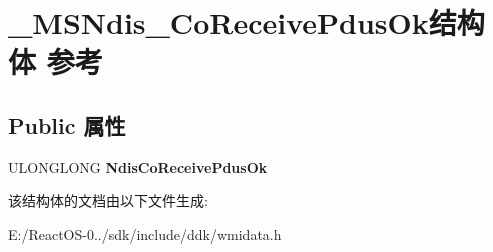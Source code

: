 \hypertarget{struct___m_s_ndis___co_receive_pdus_ok}{}\section{\+\_\+\+M\+S\+Ndis\+\_\+\+Co\+Receive\+Pdus\+Ok结构体 参考}
\label{struct___m_s_ndis___co_receive_pdus_ok}
\subsection*{Public 属性}
\begin{DoxyCompactItemize}
\item 
\mbox{\label{struct___m_s_ndis___co_receive_pdus_ok_ad9df6c874d320dae0e34adef3f67ace5}} 
U\+L\+O\+N\+G\+L\+O\+NG {\bfseries Ndis\+Co\+Receive\+Pdus\+Ok}
\end{DoxyCompactItemize}


该结构体的文档由以下文件生成\+:\begin{DoxyCompactItemize}
\item 
E\+:/\+React\+O\+S-\/0../sdk/include/ddk/wmidata.\+h\end{DoxyCompactItemize}
